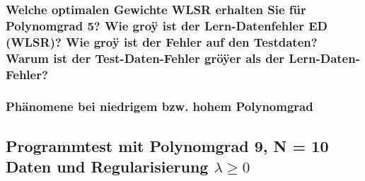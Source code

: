 \subsubsection{Welche optimalen Gewichte WLSR erhalten Sie für Polynomgrad 5? 
                Wie groÿ ist der Lern-Datenfehler ED (WLSR)? 
                Wie groÿ ist der Fehler auf den Testdaten? 
                Warum ist der Test-Daten-Fehler gröÿer als der Lern-Daten-Fehler?}

\subsubsection{Phänomene bei niedrigem bzw. hohem Polynomgrad}


\subsection{Programmtest mit Polynomgrad 9, N = 10 Daten und Regularisierung $\lambda \ge 0$}


